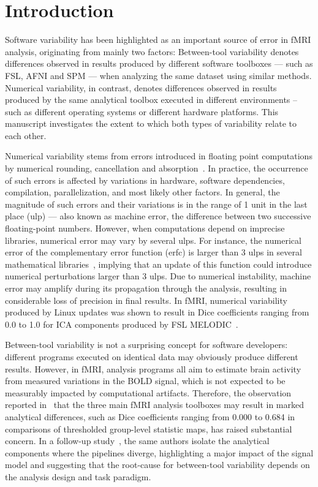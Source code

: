 \documentclass[conference]{IEEEtran}
\begin{document}
\section{Introduction}

Software variability has been highlighted as an important source of error
in fMRI analysis, originating from mainly two factors: Between-tool
variability denotes differences observed in results produced by different
software toolboxes --- such as FSL, AFNI and SPM --- when analyzing the same dataset
using similar methods. Numerical variability, in contrast, denotes
differences observed in results produced by the same analytical toolbox
executed in different environments – such as different operating systems or
different hardware platforms. This manuscript investigates the extent to
which both types of variability relate to each other.

Numerical variability stems from errors introduced in floating point
computations by numerical rounding, cancellation and absorption~\cite{muller2018handbook}. In
practice, the occurrence of such errors is affected by variations in
hardware, software dependencies, compilation, parallelization, and most
likely other factors. In general, the magnitude of such errors and their
variations is in the range of 1 unit in the last place (ulp) --- also known
as machine error, the difference between two successive floating-point
numbers. However, when computations depend on imprecise libraries,
numerical error may vary by several ulps. For instance, the numerical error
of the complementary error function (erfc) is larger than 3 ulps in several
mathematical libraries~\cite{zimmermann:hal-03141101}, implying that an update of this function could introduce
numerical perturbations larger than 3 ulps. Due to numerical instability,
machine error may amplify during its propagation through the analysis,
resulting in considerable loss of precision in final results. In fMRI,
numerical variability produced by Linux updates was shown to result in Dice
coefficients ranging from 0.0 to 1.0 for ICA components produced by FSL
MELODIC~\cite{Glatard2015}.

Between-tool variability is not a surprising concept for software
developers: different programs executed on identical data may obviously
produce different results. However, in fMRI, analysis programs all aim to
estimate brain activity from measured variations in the BOLD signal, which
is not expected to be measurably impacted by computational artifacts.
Therefore, the observation reported in~\cite{bowring2019exploring} that the three
main fMRI analysis toolboxes may result in marked
analytical differences, such as Dice coefficients ranging from 0.000 to
0.684 in comparisons of thresholded group-level statistic maps, has raised
substantial concern. In a follow-up study~\cite{bowring2021isolating}, the same
authors isolate the analytical components where the pipelines diverge,
highlighting a major impact of the signal model and suggesting that the
root-cause for between-tool variability depends on the analysis design and
task paradigm.  
\end{document}
